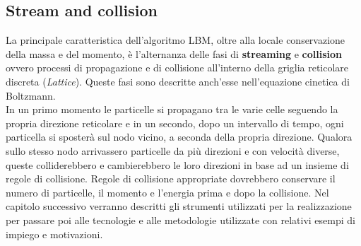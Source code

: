 \subsection{Stream and collision}
La principale caratteristica dell'algoritmo LBM, oltre alla locale conservazione della massa e del momento, \`e l'alternanza delle fasi di \textbf{streaming} e \textbf{collision} ovvero processi di propagazione e di collisione all'interno della griglia reticolare discreta (\textit{Lattice}). Queste fasi sono descritte anch'esse nell'equazione cinetica di Boltzmann.\\
In un primo momento le particelle si propagano tra le varie celle seguendo la propria direzione reticolare e in un secondo, dopo un intervallo di tempo, ogni particella si sposter\`a sul nodo vicino, a seconda della propria direzione. Qualora sullo stesso nodo arrivassero particelle da pi\`u direzioni e con velocit\`a diverse, queste colliderebbero e cambierebbero le loro direzioni in base ad un insieme di regole di collisione. Regole di collisione appropriate dovrebbero conservare il numero di particelle, il momento e l'energia prima e dopo la collisione.
Nel capitolo successivo verranno descritti gli strumenti utilizzati per la realizzazione per passare poi alle tecnologie e alle metodologie utilizzate con relativi esempi di impiego e motivazioni.
